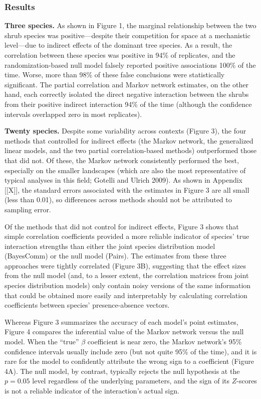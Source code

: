 \documentclass[12pt,]{article}
\begin{document}
\begin{spacing}{1.9}
\begin{flushleft}
\subsubsection{Results}\label{results}

\noindent \textbf{Three species.} As shown in Figure 1, the marginal
relationship between the two shrub species was positive---despite their
competition for space at a mechanistic level---due to indirect effects
of the dominant tree species. As a result, the correlation between these
species was positive in 94\% of replicates, and the randomization-based
null model falsely reported positive associations 100\% of the time.
Worse, more than 98\% of these false conclusions were statistically
significant. The partial correlation and Markov network estimates, on
the other hand, each correctly isolated the direct negative interaction
between the shrubs from their positive indirect interaction 94\% of the
time (although the confidence intervals overlapped zero in most
replicates).

\noindent
\textbf{Twenty species.} Despite some variability across contexts
(Figure 3), the four methods that controlled for indirect effects (the
Markov network, the generalized linear models, and the two partial
correlation-based methods) outperformed those that did not. Of these,
the Markov network consistently performed the best, especially on the
smaller landscapes (which are also the most representative of typical
analyses in this field; Gotelli and Ulrich 2009). As shown in Appendix
{[}{[}X{]}{]}, the standard errors associated with the estimates in
Figure 3 are all small (less than 0.01), so differences across methods
should not be attributed to sampling error.

Of the methods that did not control for indirect effects, Figure 3 shows
that simple correlation coefficients provided a more reliable indicator
of species' true interaction strengths than either the joint species
distribution model (BayesComm) or the null model (Pairs). The estimates
from these three approaches were tightly correlated (Figure 3B),
suggesting that the effect sizes from the null model (and, to a lesser
extent, the correlation matrices from joint species distribution models)
only contain noisy versions of the same information that could be
obtained more easily and interpretably by calculating correlation
coefficients between species' presence-absence vectors.

Whereas Figure 3 summarizes the accuracy of each model's point
estimates, Figure 4 compares the inferential value of the Markov network
versus the null model. When the ``true'' \(\beta\) coefficient is near
zero, the Markov network's 95\% confidence intervals usually include
zero (but not quite 95\% of the time), and it is rare for the model to
confidently attribute the wrong sign to a coefficient (Figure 4A). The
null model, by contrast, typically rejects the null hypothesis at the
\(p=0.05\) level regardless of the underlying parameters, and the sign
of its \(Z\)-scores is not a reliable indicator of the interaction's
actual sign.


\end{flushleft}
\end{spacing}
\end{document}
